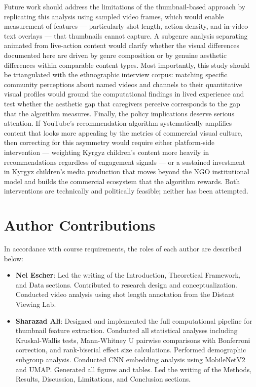 \documentclass[12pt, letterpaper]{article}
\begin{document}
Future work should address the limitations of the thumbnail-based approach by replicating this analysis using sampled video frames, which would enable measurement of features — particularly shot length, action density, and in-video text overlays — that thumbnails cannot capture. A subgenre analysis separating animated from live-action content would clarify whether the visual differences documented here are driven by genre composition or by genuine aesthetic differences within comparable content types. Most importantly, this study should be triangulated with the ethnographic interview corpus: matching specific community perceptions about named videos and channels to their quantitative visual profiles would ground the computational findings in lived experience and test whether the aesthetic gap that caregivers perceive corresponds to the gap that the algorithm measures. Finally, the policy implications deserve serious attention. If YouTube's recommendation algorithm systematically amplifies content that looks more appealing by the metrics of commercial visual culture, then correcting for this asymmetry would require either platform-side intervention — weighting Kyrgyz children's content more heavily in recommendations regardless of engagement signals — or a sustained investment in Kyrgyz children's media production that moves beyond the NGO institutional model and builds the commercial ecosystem that the algorithm rewards. Both interventions are technically and politically feasible; neither has been attempted.

\newpage

\section*{Author Contributions}
\noindent In accordance with course requirements, the roles of each author are described below:

\begin{itemize}
    \item \textbf{Nel Escher}: Led the writing of the Introduction, Theoretical Framework, and Data sections. Contributed to research design and conceptualization. Conducted video analysis using shot length annotation from the Distant Viewing Lab.

    \item \textbf{Sharazad Ali}: Designed and implemented the full computational pipeline for thumbnail feature extraction. Conducted all statistical analyses including Kruskal-Wallis tests, Mann-Whitney U pairwise comparisons with Bonferroni correction, and rank-biserial effect size calculations. Performed demographic subgroup analysis. Conducted CNN embedding analysis using MobileNetV2 and UMAP. Generated all figures and tables. Led the writing of the Methods, Results, Discussion, Limitations, and Conclusion sections.
\end{itemize}
\end{document}
